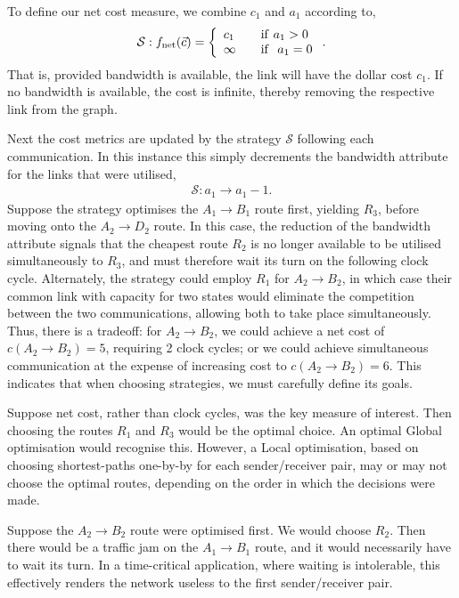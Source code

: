 \documentclass[aps,rmp,twocolumn,amsmath,amssymb,nofootinbib,superscriptaddress]{revtex4}
\begin{document}
To define our net cost measure, we combine $c_1$ and $a_1$ according to,
\begin{align}
\mathcal{S} : f_\mathrm{net}(\vec{c}) = \left\{
\begin{array}{l l}
c_1 & \quad \mathrm{if}~ a_1>0 \\
\infty & \quad \mathrm{if}~~ a_1=0 \\
\end{array} \right..
\end{align}
That is, provided bandwidth is available, the link will have the dollar cost $c_1$. If no bandwidth is available, the cost is infinite, thereby removing the respective link from the graph.

Next the cost metrics are updated by the strategy $\mathcal{S}$ following each communication. In this instance this simply decrements the bandwidth attribute for the links that were utilised,
\begin{align}
\mathcal{S} : a_1 \to a_1-1.
\end{align}
Suppose the strategy optimises the \mbox{$A_1\to B_1$} route first, yielding $R_3$, before moving onto the \mbox{$A_2\to D_2$} route. In this case, the reduction of the bandwidth attribute signals that the cheapest route $R_2$ is no longer available to be utilised simultaneously to $R_3$, and must therefore wait its turn on the following clock cycle. Alternately, the strategy could employ $R_1$ for \mbox{$A_2\to B_2$}, in which case their common link with capacity for two states would eliminate the competition between the two communications, allowing both to take place simultaneously. Thus, there is a tradeoff: for \mbox{$A_2\to B_2$}, we could achieve a net cost of \mbox{$c(A_2\to B_2)=5$}, requiring 2 clock cycles; or we could achieve simultaneous communication at the expense of increasing cost to \mbox{$c(A_2\to B_2)=6$}. This indicates that when choosing strategies, we must carefully define its goals.

Suppose net cost, rather than clock cycles, was the key measure of interest. Then choosing the routes $R_1$ and $R_3$ would be the optimal choice. An optimal {\sc Global} optimisation would recognise this. However, a {\sc Local} optimisation, based on choosing shortest-paths one-by-by for each sender/receiver pair, may or may not choose the optimal routes, depending on the order in which the decisions were made.

Suppose the \mbox{$A_2\to B_2$} route were optimised first. We would choose $R_2$. Then there would be a traffic jam on the \mbox{$A_1\to B_1$} route, and it would necessarily have to wait its turn. In a time-critical application, where waiting is intolerable, this effectively renders the network useless to the first sender/receiver pair.
\end{document}
